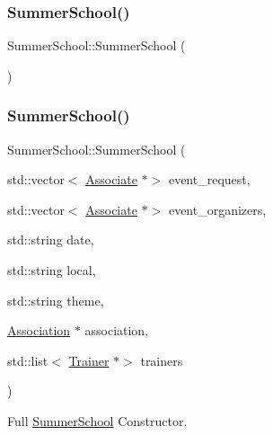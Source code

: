 \subsubsection{\texorpdfstring{Summer\+School()}{SummerSchool()}\hspace{0.1cm}{\footnotesize\ttfamily [1/3]}}
{\footnotesize\ttfamily Summer\+School\+::\+Summer\+School (\begin{DoxyParamCaption}{ }\end{DoxyParamCaption})}

\mbox{\label{classSummerSchool_a4fa81719de6c453629fd522530cbb911}} 
\subsubsection{\texorpdfstring{Summer\+School()}{SummerSchool()}\hspace{0.1cm}{\footnotesize\ttfamily [2/3]}}
{\footnotesize\ttfamily Summer\+School\+::\+Summer\+School (\begin{DoxyParamCaption}\item[{std\+::vector$<$ \hyperlink{classAssociate}{Associate} $\ast$$>$}]{event\+\_\+request,  }\item[{std\+::vector$<$ \hyperlink{classAssociate}{Associate} $\ast$$>$}]{event\+\_\+organizers,  }\item[{std\+::string}]{date,  }\item[{std\+::string}]{local,  }\item[{std\+::string}]{theme,  }\item[{\hyperlink{classAssociation}{Association} $\ast$}]{association,  }\item[{std\+::list$<$ \hyperlink{classTrainer}{Trainer} $\ast$$>$}]{trainers }\end{DoxyParamCaption})}



Full \hyperlink{classSummerSchool}{Summer\+School} Constructor. 


